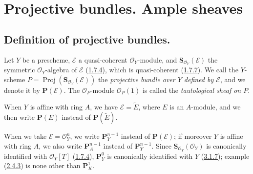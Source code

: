 \section{Projective bundles. Ample sheaves}
\label{section:II.4}

\subsection{Definition of projective bundles.}
\label{subsection:II.4.1}

\begin{definition}[4.1.1]
\label{II.4.1.1}
Let $Y$ be a prescheme, $\mathcal{E}$ a quasi-coherent $\mathcal{O}_Y$-module,
and $\mathbf{S}_{\mathcal{O}_Y}(\mathcal{E})$ the symmetric
$\mathcal{O}_Y$-algebra of $\mathcal{E}$
(\hyperref[II.1.7.4]{1.7.4}), which is quasi-coherent
(\hyperref[II.1.7.7]{1.7.7}). We call the $Y$-scheme
$P=\operatorname{Proj}(\mathbf{S}_{\mathcal{O}_Y}(\mathcal{E}))$ the
\emph{projective bundle over $Y$ defined by $\mathcal{E}$}, and we denote it by
$\mathbf{P}(\mathcal{E})$. The
$\mathcal{O}_P$-module $\mathcal{O}_P(1)$ is called the \emph{tautological
sheaf on $P$}.
\end{definition}

When $Y$ is affine with ring $A$, we have $\mathcal{E}=\widetilde{E}$, where
$E$ is an $A$-module, and we then write $\mathbf{P}(E)$ instead of
$\mathbf{P}(\widetilde{E})$.

When we take $\mathcal{E}=\mathcal{O}_Y^n$, we write
$\mathbf{P}_Y^{n-1}$ instead of $\mathbf{P}(\mathcal{E})$; if moreover $Y$
is affine with ring $A$, we also write $\mathbf{P}_A^{n-1}$ instead of
$\mathbf{P}_Y^{n-1}$. Since
$\mathbf{S}_{\mathcal{O}_Y}(\mathcal{O}_Y)$ is canonically identified with
$\mathcal{O}_Y[T]$ (\hyperref[II.1.7.4]{1.7.4}),
$\mathbf{P}_Y^0$ is canonically identified with $Y$
(\hyperref[II.3.1.7]{3.1.7}); example
(\hyperref[II.2.4.3]{2.4.3}) is none other than $\mathbf{P}_K^1$.

